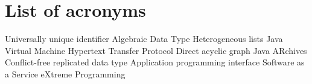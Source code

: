 \chapter{List of acronyms}

{\small
\begin{acronym}[XXXXXXXX]
       {Universally unique identifier}
        {Algebraic Data Type}
      {Heterogeneous lists}
        {Java Virtual Machine}
       {Hypertext Transfer Protocol}
        {Direct acyclic graph}
        {Java ARchives}
       {Conflict-free replicated data type}
        {Application programming interface}
       {Software as a Service}
         {eXtreme Programming}
\end{acronym}
}

